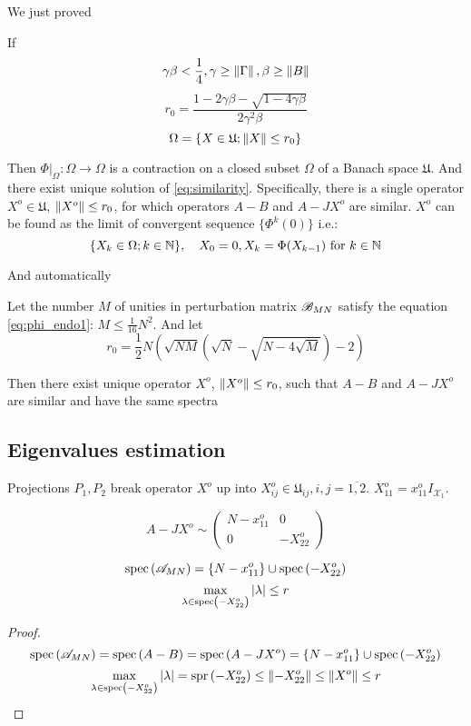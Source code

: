 \documentclass{article}
\begin{document}
We just proved
\begin{lemma}
    If
    \[\gamma\beta<\frac14, \gamma\geq\left\|{\Gamma}\right\|, \beta\geq\left\|{B}\right\|\]
    \[r_0 = \frac{1 - 2\gamma\beta - \sqrt{1-4\gamma\beta}}{2 \gamma^2 \beta}\]
    \[\Omega = \{ X\in\mathfrak U; \left\|{X}\right\| \leq r_0 \}\]

    Then
    \( \Phi|_{\Omega}:\Omega\to\Omega \) is a contraction
    on a closed subset \( \Omega \) of a Banach space \( \mathfrak U \).
    And there exist unique solution of \eqref{eq:similarity}.
    Specifically, there is a single operator \( X^o\in\mathfrak U \), \( \left\|{X^o}\right\| \leq r_0 \),
    for which operators \( A-B \) and \( A-JX^o \) are similar.
    \( X^o \) can be found as the limit of convergent sequence \( \{ \Phi^k(0) \} \) i.e.:
    \[\{X_k\in\Omega; k\in\mathbb{N}\}, \quad X_0 = 0, X_k = \Phi(X_{k-1}) \text{ for } k\in\mathbb{N}\]
\end{lemma}
And automatically
\begin{thm}
    Let the number \( M \) of unities in perturbation matrix \( \mathscr{B}_{{M}{N}} \)
    satisfy the equation \eqref{eq:phi_endo1}: \( M \leq \frac{1}{16} N^2 \).
    And let
    \[ r_0 = \frac12 N
        \left(
        \sqrt{NM}(\sqrt{N} - \sqrt{N-4\sqrt{M}}) - 2
        \right) \]

    Then there exist unique operator \( X^o \), \( \left\|{X^o}\right\| \leq r_0 \), such that \( A - B \) and \( A - J X^o \) are similar
    and have the same spectra
\end{thm}

\subsection{Eigenvalues estimation}
Projections \( P_1, P_2 \) break operator \( X^o \) up
into \( X_{ij}^o\in\mathfrak U_{ij}, i,j=\overline{1,2} \).
\( X_{11}^o = x_{11}^o I_{\mathcal X_1} \).

\[
    A-JX^o \sim
    \left(
\begin{array}{c|c}
    N-x_{11}^o & 0 \\
    \hline
    0        & -X_{22}^o
\end{array}
\right)
\]

\begin{propose}
    \[ \mathrm{spec}\left({\mathscr{A}_{{M}{N}}}\right)  = \left\{N - x_{11}^o\right\} \cup \mathrm{spec}\left({-X_{22}^o}\right) \]
    \[ \max_{\lambda\in\mathrm{spec}\left({-X_{22}^o}\right)} \left|\lambda\right| \leq r \]
\end{propose}
\begin{proof}
    \[ \mathrm{spec}\left({\mathscr{A}_{{M}{N}}}\right) = \mathrm{spec}\left({A-B}\right) = \mathrm{spec}\left({A-JX^o}\right) = \{N - x_{11}^o\} \cup \mathrm{spec}\left({-X_{22}^o}\right) \]
    \[ \max_{\lambda\in\mathrm{spec}\left({-X_{22}^o}\right)} \left|\lambda\right| = \mathrm{spr}\left({-X_{22}^o}\right) \leq \left\|{-X_{22}^o}\right\| \leq \left\|{X^o}\right\| \leq r \]
\end{proof}
\end{document}
